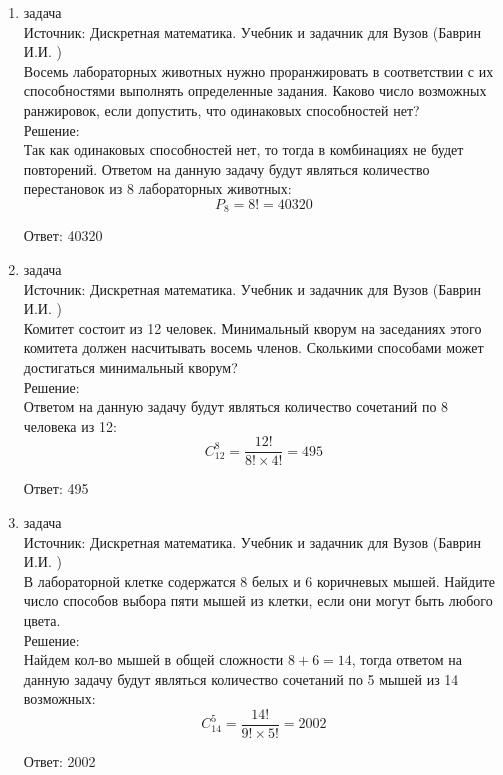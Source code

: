 \documentclass[a4paper,14pt]{extreport} %
\begin{document}
\begin{center}
\begin{enumerate}
						 \item {\large задача  }\\
						 Источник: Дискретная математика. Учебник и задачник для Вузов (Баврин И.И. )\\
						 \vspace{15pt}
						 Восемь лабораторных животных нужно проранжировать в соответствии с их способностями выполнять определенные задания. Каково число возможных ранжировок, если допустить, что одинаковых способностей нет?\\
						 \vspace{15pt}
						 Решение:\\
						 Так как одинаковых способностей нет, то тогда в комбинациях не будет повторений. 
						 Ответом на данную задачу будут являться количество перестановок из 8 лабораторных животных:
						 \begin{equation}
						 	P_{8} = 8! = 40320
						 \end{equation}
						 
						 Ответ: 40320
						 
						 \item {\large задача  }\\
						 Источник: Дискретная математика. Учебник и задачник для Вузов (Баврин И.И. )\\
						 \vspace{15pt}
						 Комитет состоит из 12 человек. Минимальный кворум на заседаниях этого комитета должен насчитывать восемь членов. Сколькими способами может достигаться минимальный кворум?\\
						 \vspace{15pt}
						 Решение:\\
						 Ответом на данную задачу будут являться количество сочетаний по 8 человека из 12:
						 \begin{equation}
						 	C_{12}^8 =\frac{12!}{8!\times4!} = 495
						 \end{equation}
						 
						 Ответ: 495
						 
						 \item {\large задача  }\\
						 Источник: Дискретная математика. Учебник и задачник для Вузов (Баврин И.И. )\\
						 \vspace{15pt}
						 В лабораторной клетке содержатся 8 белых и 6 коричневых мышей. Найдите число способов выбора пяти мышей из клетки, если они могут быть любого цвета.\\
						 \vspace{15pt}
						 Решение:\\
						 Найдем кол-во мышей в общей сложности $8+6 = 14$, тогда
						 ответом на данную задачу будут являться количество сочетаний по 5 мышей из 14 возможных:
						 \begin{equation}
						 	C_{14}^5 = \frac{14!}{9!\times5!} = 2002
						 \end{equation}
						 
						 Ответ: 2002
				\end{enumerate}
			\end{center}
			



	
	
\end{document}
